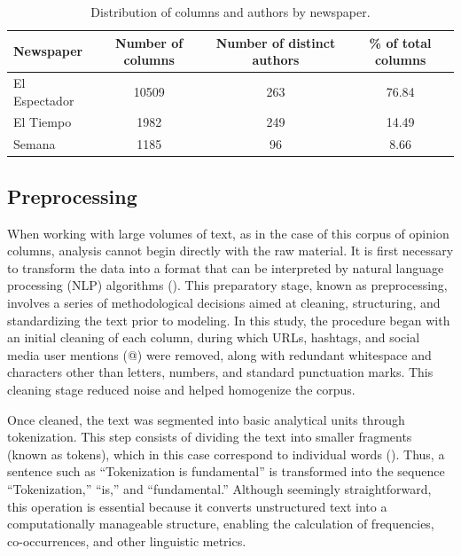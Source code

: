 \documentclass[11pt,a4paper]{article}
\begin{document}
	\begin{table}[H]
		\centering
		\caption{Distribution of columns and authors by newspaper.}
		\label{tab:col_autores_periodico}
		\footnotesize
		\begin{tabular}{l c c c}
			\hline
			\textbf{Newspaper} & \textbf{Number of columns} & \textbf{Number of distinct authors} & \textbf{\% of total columns} \\
			\hline
			El Espectador & 10509 & 263 & 76.84\\
			El Tiempo & 1982 &  249 & 14.49\\
			Semana & 1185 & 96  & 8.66\\
			\hline
		\end{tabular}
		
	\end{table}
	
	\subsection{Preprocessing}

		When working with large volumes of text, as in the case of this corpus of opinion columns, analysis cannot begin directly with the raw material. It is first necessary to transform the data into a format that can be interpreted by natural language processing (NLP) algorithms (\cite{Chai2022}). This preparatory stage, known as preprocessing, involves a series of methodological decisions aimed at cleaning, structuring, and standardizing the text prior to modeling. In this study, the procedure began with an initial cleaning of each column, during which URLs, hashtags, and social media user mentions (@) were removed, along with redundant whitespace and characters other than letters, numbers, and standard punctuation marks. This cleaning stage reduced noise and helped homogenize the corpus.

		Once cleaned, the text was segmented into basic analytical units through tokenization. This step consists of dividing the text into smaller fragments (known as tokens), which in this case correspond to individual words (\cite{Tyagi_text}). Thus, a sentence such as “Tokenization is fundamental” is transformed into the sequence “Tokenization,” “is,” and “fundamental.” Although seemingly straightforward, this operation is essential because it converts unstructured text into a computationally manageable structure, enabling the calculation of frequencies, co-occurrences, and other linguistic metrics.
		
\end{document}

